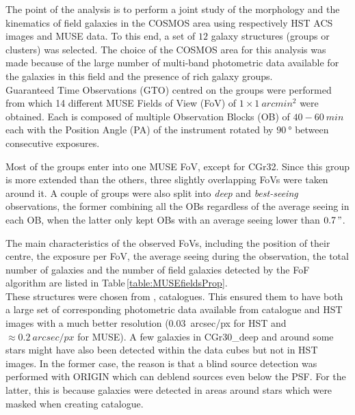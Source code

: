 The point of the analysis is to perform a joint study of the morphology and the kinematics of field galaxies in the COSMOS area  using respectively HST ACS images and MUSE data. To this end, a set of $12$ galaxy structures (groups or clusters) was selected. The choice of the COSMOS area for this analysis was made because of the large number of multi-band photometric data available for the galaxies in this field and the presence of rich galaxy groups.\\

Guaranteed Time Observations (GTO) centred on the groups were performed from which 14 different MUSE Fields of View (FoV) of $1 \times \SI{1}{arcmin^2} $ were obtained. Each is composed of multiple Observation Blocks (OB) of $40-\SI{60}{min}$ each with the Position Angle (PA) of the instrument rotated by $\SI{90}{\degree}$ between consecutive exposures.

Most of the groups enter into one MUSE FoV, except for CGr32. Since this group is more extended than the others, three slightly overlapping FoVs were taken around it. A couple of groups were also split into \textit{deep} and \textit{best-seeing} observations, the former combining all the OBs regardless of the average seeing in each OB, when the latter only kept OBs with an average seeing lower than $\SI{0.7}{"}$.

 The main characteristics of the observed FoVs, including the position of their centre, the exposure per FoV, the average seeing during the observation, the total number of galaxies and the number of field galaxies detected by the FoF algorithm are listed in Table\,\ref{table:MUSEfieldsProp}. \\

These structures were chosen from ,  catalogues. This ensured them to have both a large set of corresponding photometric data available from  catalogue and HST images with a much better resolution (\SI{0.03}{arcsec/px} for HST and $\approx \SI{0.2}{arcsec/px}$ for MUSE). A few galaxies in CGr30\_deep and around some stars might have also been detected within the data cubes but not in HST images. In the former case, the reason is that a blind source detection was performed with ORIGIN  which can deblend sources even below the PSF. For the latter, this is because galaxies were detected in areas around stars which were masked when creating  catalogue.

